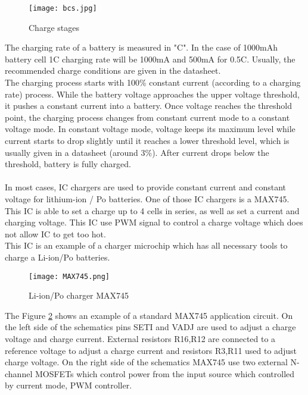 \begin{figure}[h]
	\centering
	\texttt{[image: bcs.jpg]}
	\caption{ Charge stages \cite{14}}
	\label{fig: bcs}
\end{figure}
 The charging rate of a battery is measured in "C". In the case of 1000mAh battery cell 1C charging rate will be 1000mA and 500mA for 0.5C. Usually, the recommended charge conditions are given in the datasheet.\\
 The charging process starts with 100\%  constant current (according to a charging rate) process. While the battery voltage approaches the upper voltage threshold, it pushes a constant current into a battery. Once voltage reaches the threshold point, the charging process changes from constant current mode to a constant voltage mode. In constant voltage mode, voltage keeps its maximum level while current starts to drop slightly until it reaches a lower threshold level, which is usually given in a datasheet (around 3\%). After current drops below the threshold, battery is fully charged. \\ \\
 In most cases, IC chargers are used to provide constant current and constant voltage for lithium-ion / Po batteries. \cite{14} One of those IC chargers is a MAX745. 
This IC is able to set a charge up to 4 cells in series, as well as set a current and charging voltage. This IC use PWM signal to control a charge voltage which does not allow IC to get too hot.\\ This IC is an example of a charger microchip which has all necessary  tools to charge a Li-ion/Po batteries. 



\begin{figure}[h]
	\centering
	\texttt{[image: MAX745.png]}
	\caption{ Li-ion/Po charger MAX745 \cite{15}}
	\label{fig: EPS22}
\end{figure}

The Figure \ref{fig: EPS22} shows an example of a standard MAX745 application circuit. On the left side of the schematics pins SETI and VADJ are used to adjust a charge voltage and charge current. External resistors R16,R12 are connected to a reference voltage to adjust a charge current and resistors R3,R11  used to adjust charge voltage. On the right side of the schematics MAX745 use two external N-channel MOSFETs which control power from the input source which controlled by current mode, PWM controller. 



